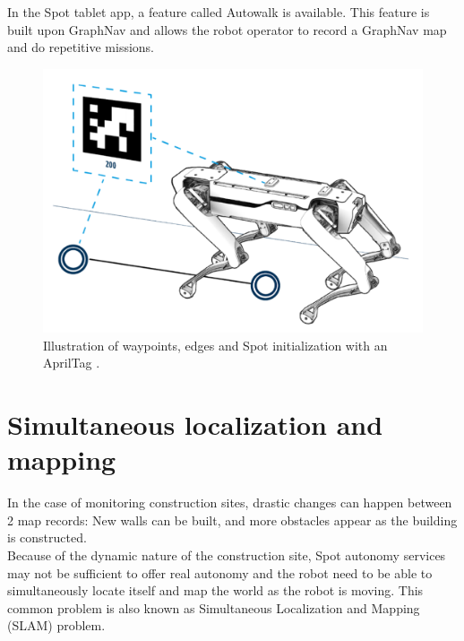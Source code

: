 In the Spot tablet app, a feature called Autowalk is available. This feature is built upon GraphNav and allows the robot operator to record a GraphNav map and do repetitive missions. 
\begin{figure}[ht]
    \centering
    \includegraphics[scale=0.5]{Img/00_SPOT2.png}
    \caption{Illustration of waypoints, edges and Spot initialization with an AprilTag \cite{SpotAutonomy}. }
    \label{fig:Spot_init}
\end{figure}
\section{Simultaneous localization and mapping}
In the case of monitoring construction sites, drastic changes can happen between 2 map records: New walls can be built, and more obstacles appear as the building is constructed. \\

Because of the dynamic nature of the construction site, Spot autonomy services may not be sufficient to offer real autonomy and the robot need to be able to simultaneously locate itself and map the world as the robot is moving. This common problem is also known as Simultaneous Localization and Mapping (SLAM) problem.\\

